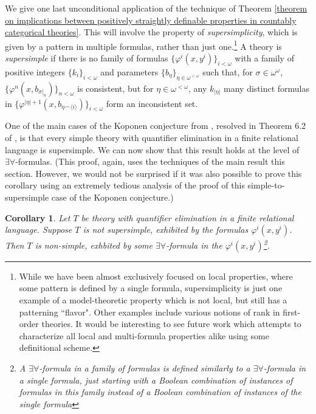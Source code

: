 \documentclass{article}
\newtheorem{corollary}{Corollary}
\theoremstyle{definition}
\theoremstyle{definition}
\theoremstyle{definition}
\begin{document}
We give one last unconditional application of the technique of Theorem \ref{theorem on implications between positively straightly definable properties in countably categorical theories}. This will involve the property of \textit{supersimplicity}, which is given by a pattern in multiple formulas, rather than just one.\footnote{While we have been almost exclusively focused on local properties, where some pattern is defined by a single formula, supersimplicity is just one example of a model-theoretic property which is not local, but still has a patterning ``flavor". Other examples include various notions of rank in first-order theories. It would be interesting to see future work which attempts to characterize all local and multi-formula properties alike using some definitional scheme.} A theory is \textit{supersimple} if there is no family of formulas $\{\varphi^{i}(x, y^{i})\}_{i < \omega}$ with a family of positive integers $\{k_{i}\}_{i < \omega}$ and parameters $\{b_{\eta}\}_{\eta \in \omega^{< \omega}}$ such that, for $\sigma \in \omega^{\omega}$, $\{\varphi^{n}(x, b_{\sigma|_{n}})\}_{n < \omega}$ is consistent, but for $\eta \in \omega^{< \omega}$, any $k_{|\eta|}$ many distinct formulas in $\{\varphi^{|\eta|+1}(x, b_{\eta \smallfrown \langle i \rangle})\}_{i < \omega}$ form an inconsistent set.

One of the main cases of the Koponen conjecture from \cite{Kop16}, resolved in Theorem 6.2 of \cite{baldwin2024simple}, is that every simple theory with quantifier elimination in a finite relational language is supersimple. We can now show that this result holds at the level of $\exists\forall$-formulas. (This proof, again, uses the techniques of the main result this section. However, we would not be surprised if it was also possible to prove this corollary using an extremely tedious analysis of the proof of this simple-to-supersimple case of the Koponen conjecture.)


\begin{corollary}
    Let $T$ be theory with quantifier elimination in a finite relational language. Suppose $T$ is not supersimple, exhibited by the formulas $\varphi^{i}(x, y^{i})$. Then $T$ is non-simple, exhbited by some $\exists\forall$-formula in the $\varphi^{i}(x, y^{i})$\footnote{A $\exists\forall$-formula in a family of formulas is defined similarly to a $\exists\forall$-formula in a single formula, just starting with a Boolean combination of instances of formulas in this family instead of a Boolean combination of instances of the single formula}.

\end{corollary}
\end{document}
